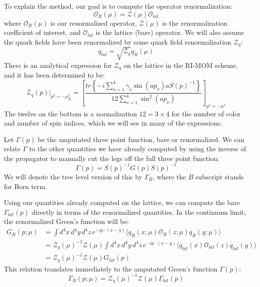 \documentclass[11pt, oneside]{article}   	%
\theoremstyle{definition}
\begin{document}
To explain the method, our goal is to compute the operator renormalization:
\begin{equation}
	\mathcal O_R(\mu) = \mathcal Z(\mu)\mathcal O_{lat}
\end{equation}
where $\mathcal O_R(\mu)$ is our renormalized operator, $\mathcal Z(\mu)$ is the renormalization coefficient of 
interest, and $\mathcal O_{lat}$ is the lattice (bare) operator. We will also assume the quark fields have been 
renormalized by some quark field renormalization $\mathcal Z_q$:
\begin{equation}
	q_{lat} = \sqrt{\mathcal Z_q} q_R(\mu)
\end{equation}
There is an analytical expression for $\mathcal{Z}_q$ on the lattice in the RI-MOM scheme, and it has been determined 
to be:
\begin{equation}
	\mathcal Z_q(p)|_{p^2 = -\mu_R^2} = \left[\frac{tr\left\{-i\sum_{\nu = 1}^4 \gamma_\nu \sin(ap_\nu) a S(p)^{-1}\right\}}{12\sum_{\nu = 1}^4 \sin^2(ap_\nu)}\right]_{p^2 = -\mu^2}
\end{equation}
The twelve on the bottom is a normalization $12 = 3\times 4$ for the number of color and number of spin indices, which we will 
see in many of the expressions. 

Let $\Gamma(p)$ be the amputated three point function, bare or renormalized. We can relate $\Gamma$ to the other 
quantities we have already computed by using the inverse of the propagator to manually cut the legs off the full three 
point function:
\begin{equation}
	\Gamma(p) = S(p)^{-1} G(p) S(p)^{-1}
\end{equation}
We will denote the tree level version of this by $\Gamma_B$, where the $B$ subscript stands for Born term. 

Using our quantities already computed on the lattice, we can compute the bare $\Gamma_{lat}(p)$ directly in terms 
of the renormalized quantities. In the continuum limit, the renormalized Green's function will be:
\begin{align}
	G_R(p; \mu) &= \int d^4x \, d^4 y\, d^4 z\, e^{-ip\cdot (x - y)} \langle q_R(x; \mu) \mathcal O_R(z; \mu) q_R(y; \mu) 
	\rangle \\
	&= \mathcal Z_q(\mu)^{-1} \mathcal Z(\mu) \int d^4x \, d^4 y\, d^4 z\, e^{-ip\cdot (x - y)} \langle q_{lat}(x) \mathcal O_{lat}
	(z) q_{lat}(y) \rangle \\
	&= \mathcal Z_q(\mu)^{-1} \mathcal Z(\mu) G_{lat}(p)
\end{align}
This relation translates immediately to the amputated Green's function $\Gamma(p)$:
\begin{equation}
	\Gamma_R(p; \mu) = \mathcal Z_q(\mu)^{-1}\mathcal Z(\mu) \Gamma_{lat}(p)
\end{equation}
\end{document}

